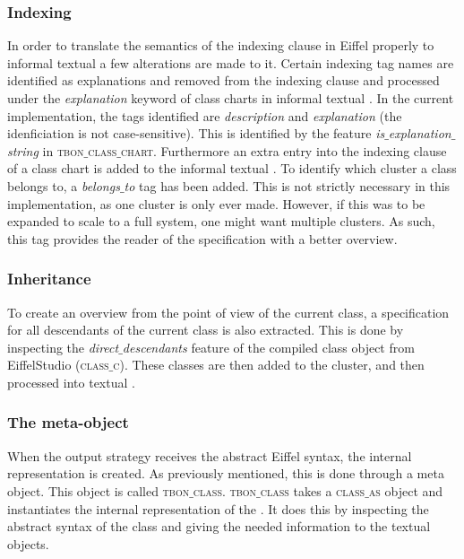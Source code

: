\subsubsection{Indexing}
In order to translate the semantics of the indexing clause in Eiffel properly to informal textual \bon{} a few alterations are made to it. Certain indexing tag names are identified as explanations and removed from the indexing clause and processed under the \textit{explanation} keyword of class charts in informal textual \bon{}. In the current implementation, the tags identified are \textit{description} and \textit{explanation} (the idenficiation is not case-sensitive). This is identified by the feature \textit{is$\_$explanation$\_$string} in \textsc{tbon$\_$class$\_$chart}. Furthermore an extra entry into the indexing clause of a class chart is added to the informal textual \bon{}. To identify which cluster a class belongs to, a \textit{belongs$\_$to} tag has been added. This is not strictly necessary in this implementation, as one cluster is only ever made. However, if this was to be expanded to scale to a full system, one might want multiple clusters. As such, this tag provides the reader of the specification with a better overview.

\subsubsection{Inheritance}
To create an overview from the point of view of the current class, a specification for all descendants of the current class is also extracted. This is done by inspecting the \textit{direct$\_$descendants} feature of the compiled class object from EiffelStudio (\textsc{class$\_$c}). These classes are then added to the cluster, and then processed into textual \bon{}.

\subsubsection{The meta-object}
\label{tbon_class}
When the output strategy receives the abstract Eiffel syntax, the internal \bon{} representation is created. As previously mentioned, this is done through a meta object. This object is called \textsc{tbon$\_$class}. \textsc{tbon$\_$class} takes a \textsc{class$\_$as} object and instantiates the internal representation of the \bon{}. It does this by inspecting the abstract syntax of the class and giving the needed information to the textual \bon{} objects.
